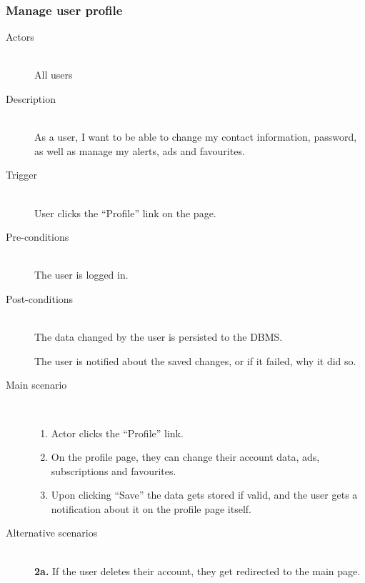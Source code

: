 \documentclass[a4wide]{article}
\begin{document}
\subsubsection{Manage user profile}
\begin{description}
\item[Actors]\mbox{}\\
All users
\item[Description]\mbox{}\\
As a user, I want to be able to change my contact information, password, as well as manage my alerts, ads and favourites.

\item[Trigger]\mbox{}\\
User clicks the “Profile” link on the page.

\item[Pre-conditions]\mbox{}\\
The user is logged in.
\item[Post-conditions]\mbox{}\\
The data changed by the user is persisted to the DBMS.

The user is notified about the saved changes, or if it failed, why it did so.

\item[Main scenario]\mbox{}\\
\begin{enumerate}
\item Actor clicks the “Profile” link.
\item On the profile page, they can change their account data, ads, subscriptions and favourites.
\item Upon clicking “Save” the data gets stored if valid, and the user gets a notification about it on the profile page itself.
\end{enumerate}
\item[Alternative scenarios]\mbox{}\\
\textbf{2a.} If the user deletes their account, they get redirected to the main page.
\end{description}
\end{document}
